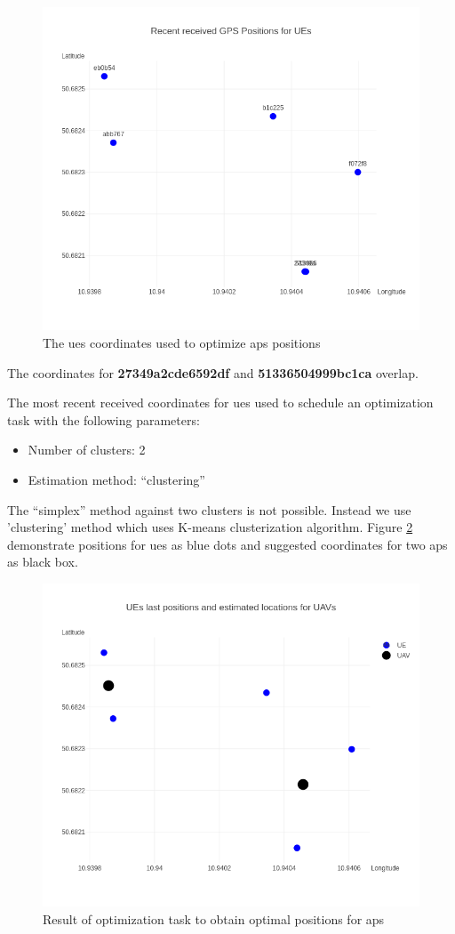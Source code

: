 \begin{figure}[H]
	\centering
	\includegraphics[width=0.5\linewidth,keepaspectratio]{images/Exp4_UEs_Location_to_optimize.png}
	\caption{The \glspl{ue} coordinates used to optimize \glspl{ap} positions}
	\label{fig:ues-positions-for-optimization}
\end{figure}

The coordinates for \textbf{27349a2cde6592df} and
\textbf{51336504999bc1ca} overlap.

The most recent received coordinates for \glspl{ue} used to schedule an optimization task with the following parameters:

\begin{itemize}
	\tightlist
	\item
	Number of clusters: 2
	\item
	Estimation method: ``clustering''
\end{itemize}

The ``simplex'' method against two clusters is not possible. Instead we use 'clustering' method which uses K-means clusterization algorithm. Figure \ref{fig:ues-positions-and-suggested-optimal-positions-for-uavs} demonstrate positions for \glspl{ue} as blue dots and suggested coordinates for two \glspl{ap} as black box.

\begin{figure}[H]
	\centering
	\includegraphics[width=0.5\linewidth,keepaspectratio]{images/Expt4_Estimated UAVs_locations.png}
	\caption{Result of optimization task to obtain optimal positions for \glspl{ap}}
	\label{fig:ues-positions-and-suggested-optimal-positions-for-uavs}
\end{figure}

